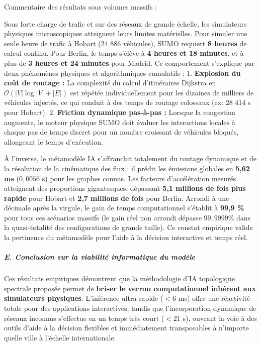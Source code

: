 \documentclass[10pt, a4paper]{article}
\begin{document}
Commentaire des résultats sous volumes massifs :

Sous forte charge de trafic et sur des réseaux de grande échelle, les
simulateurs physiques microscopiques atteignent leurs limites
matérielles. Pour simuler une seule heure de trafic à Hobart (24 886
véhicules), SUMO requiert \textbf{8 heures} de calcul continu. Pour
Berlin, le temps s'élève à \textbf{4 heures et 18 minutes}, et à plus de
\textbf{3 heures et 24 minutes} pour Madrid. Ce comportement s'explique
par deux phénomènes physiques et algorithmiques cumulatifs : 1.
\textbf{Explosion du coût de routage :} La complexité du calcul
d'itinéraires Dijkstra en \(\mathcal{O}(|V| \log |V| + |E|)\) est
répétée individuellement pour les dizaines de milliers de véhicules
injectés, ce qui conduit à des temps de routage colossaux (ex: 28 414 s
pour Hobart). 2. \textbf{Friction dynamique pas-à-pas :} Lorsque la
congestion augmente, le moteur physique SUMO doit évaluer les
interactions locales à chaque pas de temps discret pour un nombre
croissant de véhicules bloqués, allongeant le temps d'exécution.

À l'inverse, le métamodèle IA s'affranchit totalement du routage
dynamique et de la résolution de la cinématique des flux : il prédit les
émissions globales en \textbf{5,62 ms} (\(0,0056\) s) pour les graphes
connus. Les facteurs d'accélération mesurés atteignent des proportions
gigantesques, dépassant \textbf{5,1 millions de fois plus rapide} pour
Hobart et \textbf{2,7 millions de fois} pour Berlin. Arrondi à une
décimale après la virgule, le gain de temps computationnel s'établit à
\textbf{99,9 \%} pour tous ces scénarios massifs (le gain réel non
arrondi dépasse \(99,9999\%\) dans la quasi-totalité des configurations
de grande taille). Ce constat empirique valide la pertinence du
métamodèle pour l'aide à la décision interactive et temps réel.

\subparagraph{E. Conclusion sur la viabilité informatique du
modèle}\label{e.-conclusion-sur-la-viabilituxe9-informatique-du-moduxe8le}

Ces résultats empiriques démontrent que la méthodologie d'IA topologique
spectrale proposée permet de \textbf{briser le verrou computationnel
inhérent aux simulateurs physiques}. L'inférence ultra-rapide (\(<6\)
ms) offre une réactivité totale pour des applications interactives,
tandis que l'incorporation dynamique de réseaux inconnus s'effectue en
un temps très court (\(<21\) s), ouvrant la voie à des outils d'aide à
la décision flexibles et immédiatement transposables à n'importe quelle
ville à l'échelle internationale.
\end{document}
